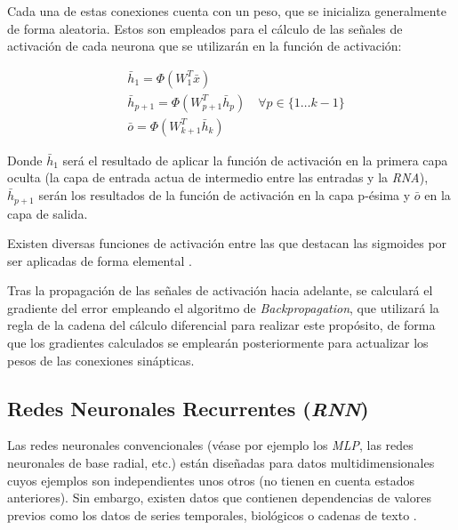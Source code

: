 Cada una de estas conexiones cuenta con un peso, que se inicializa generalmente de forma aleatoria. Estos son
empleados para el cálculo de las señales de activación de cada neurona que se utilizarán en la función de activación:

\begin{equation}
    \begin{aligned}
    & \bar{h}_1=\Phi\left(W_1^T \bar{x}\right) \\
    & \bar{h}_{p+1}=\Phi\left(W_{p+1}^T \bar{h}_p\right) \quad \forall p \in\{1 \ldots k-1\}\\
    & \bar{o}=\Phi\left(W_{k+1}^T \bar{h}_k\right)
    \end{aligned}
\end{equation}

Donde \begin{math}\bar{h}_1\end{math} será el resultado de aplicar la función de activación en la primera capa oculta (la capa de entrada
actua de intermedio entre las entradas y la \textit{RNA}), \begin{math}\bar{h}_{p+1}\end{math} serán los resultados de la función de activación
en la capa p-ésima y \begin{math}\bar{o}\end{math} en la capa de salida.


Existen diversas funciones de activación entre las que destacan las sigmoides por ser aplicadas de forma 
elemental \cite{book:aggarwal2018}.

Tras la propagación de las señales de activación hacia adelante, se calculará el gradiente del error empleando el algoritmo
de \textit{Backpropagation}, que utilizará la regla de la cadena del cálculo diferencial para realizar este propósito, de forma 
que los gradientes calculados se emplearán posteriormente para actualizar los pesos de las conexiones sinápticas.

\subsection{Redes Neuronales Recurrentes (\textit{RNN})}
Las redes neuronales convencionales (véase por ejemplo los \textit{MLP}, las redes neuronales de base radial, etc.) están diseñadas para
datos multidimensionales cuyos ejemplos son independientes unos otros (no tienen en cuenta estados anteriores).
Sin embargo, existen datos que contienen dependencias de valores previos como los datos de series temporales, 
biológicos o cadenas de texto \cite{book:aggarwal2018}.

